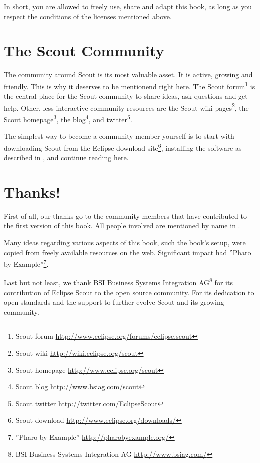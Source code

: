 \documentclass[a4paper,10pt,twoside]{book}
\begin{document}
\noindent In short, you are allowed to freely use, share and adapt this book, as long as you respect the conditions of the licenses mentioned above.

\newpage

\section*{The Scout Community}

The community around Scout is its most valuable asset.
It is active, growing and friendly.
This is why it deserves to be mentionend right here.
The Scout forum\footnote{Scout forum \url{http://www.eclipse.org/forums/eclipse.scout}} is the central place for the Scout community to share ideas, ask questions and get help. 
Other, less interactive community resources are the Scout wiki 
pages\footnote{Scout wiki \url{http://wiki.eclipse.org/scout}}, the Scout 
homepage\footnote{Scout homepage \url{http://www.eclipse.org/scout}}, 
the blog\footnote{Scout blog \url{http://www.bsiag.com/scout}}, and 
twitter\footnote{Scout twitter \url{http://twitter.com/EclipseScout}}.

The simplest way to become a community member yourself is to start with downloading
Scout from the Eclipse download site\footnote{Scout download \url{http://www.eclipse.org/downloads/}}, 
installing the software as described in , and continue reading here.

\section*{Thanks!}

First of all, our thanks go to the community members that have contributed to the first version of this book. 
All people involved are mentioned by name in .

Many ideas regarding various aspects of this book, such the book's setup, were copied from freely available resources on the web. 
Significant impact had ''Pharo by Example''\footnote{''Pharo by Example'' \url{http://pharobyexample.org/}}.

Last but not least, we thank BSI Business Systems Integration 
AG\footnote{BSI Business Systems Integration AG \url{http://www.bsiag.com/}} for its contribution of Eclipse Scout to the open source community.
For its dedication to open standards and the support to further evolve Scout and its growing community.


\ifx\wholebook\relax\else
   
   
\end{document}
